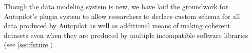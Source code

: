 Though the data modeling system is new, we have laid the groundwork for Autopilot's plugin system to allow researchers to declare custom schema for all data produced by Autopilot as well as additional means of making coherent datasets even when they are produced by multiple incompatible software libraries (see \ref{sec:future}).



